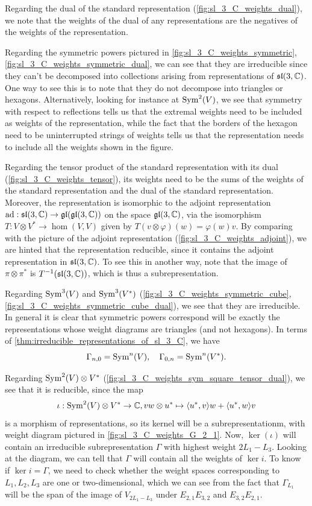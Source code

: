 \documentclass{report}
\begin{document}
Regarding the dual of the standard representation (\cref{fig:sl_3_C_weights_dual}), we note that the weights of the dual of any representations are the negatives of the weights of the representation.

Regarding the symmetric powers pictured in \cref{fig:sl_3_C_weights_symmetric}, \cref{fig:sl_3_C_weights_symmetric_dual}, we can see that they are irreducible since they can't be decomposed into collections arising from representations of $\operatorname{{\mathfrak{sl}}}(3, \mathbb C)$.
One way to see this is to note that they do not decompose into triangles or hexagons.
Alternatively, looking for instance at $\operatorname{Sym}^2(V)$, we see that symmetry with respect to reflections tells us that the extremal weights need to be included as weights of the representation, while the fact that the borders of the hexagon need to be uninterrupted strings of weights tells us that the representation needs to include all the weights shown in the figure.

Regarding the tensor product of the standard representation with its dual (\cref{fig:sl_3_C_weights_tensor}), its weights need to be the sums of the weights of the standard representation and the dual of the standard representation.
Moreover, the representation is isomorphic to the adjoint representation $\operatorname{ad}: \operatorname{{\mathfrak{sl}}}(3, \mathbb C) \to \operatorname{{\mathfrak{gl}}}(\operatorname{{\mathfrak{gl}}}(3, \mathbb C))$ on the space $\operatorname{{\mathfrak{gl}}}(3, \mathbb C)$, via the isomorphism $T: V \otimes V^* \to \hom(V, V)$ given by $T(v \otimes \varphi)(w) = \varphi(w) v$.
By comparing with the picture of the adjoint representation (\cref{fig:sl_3_C_weights_adjoint}), we are hinted that the representation reducible, since it contains the adjoint representation in $\operatorname{{\mathfrak{sl}}}(3, \mathbb C)$.
To see this in another way, note that the image of $\pi \otimes \pi^*$ is $T^{-1}(\operatorname{{\mathfrak{sl}}}(3, \mathbb C))$, which is thus a subrepresentation.

Regarding $\operatorname{Sym}^3(V)$ and $\operatorname{Sym}^3(V^*)$ (\cref{fig:sl_3_C_weights_symmetric_cube}, \cref{fig:sl_3_C_weights_symmetric_cube_dual}), we see that they are irreducible.
In general it is clear that symmetric powers correspond will be exactly the representations whose weight diagrams are triangles (and not hexagons).
In terms of \cref{thm:irreducible_representations_of_sl_3_C}, we have
\[
\Gamma_{n,0} = \operatorname{Sym}^n(V), \quad \Gamma_{0,n} = \operatorname{Sym}^n(V^*).
\]

Regarding $\operatorname{Sym}^2(V) \otimes V^*$ (\cref{fig:sl_3_C_weights_sym_square_tensor_dual}), we see that it is reducible, since the map
\[
\iota: \operatorname{Sym}^2(V) \otimes V^* \to \mathbb C, v w \otimes u^* \mapsto \langle u^*, v \rangle w +  \langle u^*, w \rangle v
\]
is a morphism of representations, so its kernel will be a subrepresentationm, with weight diagram pictured in \cref{fig:sl_3_C_weights_G_2_1}.
Now, $\ker(\iota)$ will contain an irreducible subrepresentation $\Gamma$ with highest weight $2 L_1 - L_3$.
Looking at the diagram, we can tell that $\Gamma$ will contain all the weights of $\ker i$.
To know if $\ker i = \Gamma$, we need to check whether the weight spaces corresponding to $L_1, L_2, L_3$ are one or two-dimensional, which we can see from the fact that $\Gamma_{L_1}$ will be the span of the image of $V_{2L_1 - L_3}$ under $E_{2,1}E_{3,2}$ and $E_{3,2}E_{2,1}$.
\end{document}
